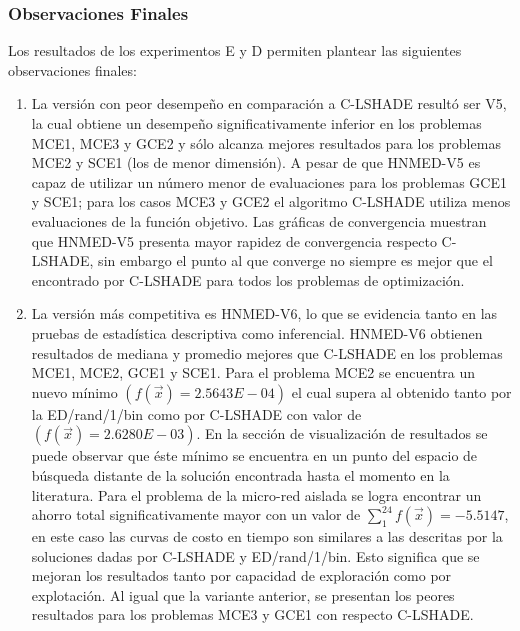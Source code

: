 \subsubsection{Observaciones Finales}
Los resultados de los experimentos E y D permiten plantear las siguientes observaciones finales:
\begin{enumerate}
 \item La versión con peor desempeño en comparación a C-LSHADE resultó ser V5, la cual obtiene un desempeño significativamente inferior en los problemas MCE1, MCE3 y GCE2  y sólo alcanza mejores resultados para los problemas MCE2 y SCE1 (los de menor dimensión). A pesar de que HNMED-V5 es capaz de utilizar un número menor de evaluaciones para los problemas GCE1 y SCE1; para los casos MCE3 y GCE2 el algoritmo C-LSHADE utiliza menos evaluaciones de la función objetivo. Las gráficas de convergencia muestran que HNMED-V5 presenta mayor rapidez de convergencia respecto C-LSHADE, sin embargo el punto al que converge no siempre es mejor que el encontrado por C-LSHADE para todos los problemas de optimización.  

 \item  La versión más competitiva es HNMED-V6, lo que se evidencia tanto en las pruebas de estadística descriptiva como inferencial. HNMED-V6 obtienen resultados de mediana y promedio mejores que C-LSHADE en los problemas MCE1, MCE2, GCE1 y SCE1. Para el problema MCE2 se encuentra un nuevo mínimo $(f(\vec{x})=2.5643E-04)$ el cual supera al obtenido tanto por la ED/rand/1/bin como por C-LSHADE con valor de $(f(\vec{x})=2.6280E-03)$. En la sección de visualización de resultados se puede observar que éste mínimo se encuentra en un punto del espacio de búsqueda distante de la solución encontrada hasta el momento en la literatura. Para el problema de la micro-red aislada se logra encontrar un ahorro total significativamente mayor con un valor de $\sum_{1}^{24}f(\vec{x})=-5.5147$, en este caso las curvas de costo en tiempo son similares a las descritas por la soluciones dadas por C-LSHADE y ED/rand/1/bin. Esto significa que se mejoran los resultados tanto por capacidad de exploración como por explotación. Al igual que la variante anterior, se presentan los peores resultados para los problemas MCE3 y GCE1 con respecto C-LSHADE.


\end{enumerate}
